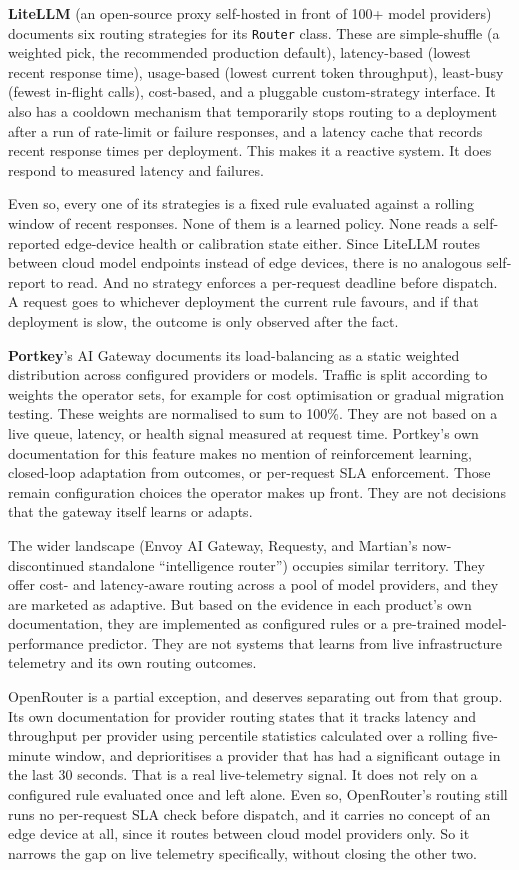 \textbf{LiteLLM} (an open-source proxy self-hosted in front of 100+
model providers) documents six routing strategies for its
\texttt{Router} class. These are simple-shuffle (a weighted pick, the
recommended production default), latency-based (lowest recent response
time), usage-based (lowest current token throughput), least-busy
(fewest in-flight calls), cost-based, and a pluggable custom-strategy
interface. It also has a cooldown mechanism that temporarily stops
routing to a deployment after a run of rate-limit or failure responses,
and a latency cache that records recent response times per deployment.
This makes it a reactive system. It does respond to measured latency
and failures.

Even so, every one of its strategies is a fixed rule evaluated against
a rolling window of recent responses. None of them is a learned policy.
None reads a self-reported edge-device health or calibration state
either. Since LiteLLM routes between cloud model endpoints instead of
edge devices, there is no analogous self-report to read. And no
strategy enforces a per-request deadline before dispatch. A request
goes to whichever deployment the current rule favours, and if that
deployment is slow, the outcome is only observed after the fact.

\textbf{Portkey}'s AI Gateway documents its load-balancing as a static
weighted distribution across configured providers or models. Traffic is
split according to weights the operator sets, for example for cost
optimisation or gradual migration testing. These weights are normalised
to sum to 100\%. They are not based on a live queue, latency, or health
signal measured at request time. Portkey's own documentation for this
feature makes no mention of reinforcement learning, closed-loop
adaptation from outcomes, or per-request SLA enforcement. Those remain
configuration choices the operator makes up front. They are not
decisions that the gateway itself learns or adapts.

The wider landscape (Envoy AI Gateway, Requesty, and Martian's
now-discontinued standalone ``intelligence router'') occupies similar
territory. They offer cost- and latency-aware routing across a pool of
model providers, and they are marketed as adaptive. But based on the
evidence in each product's own documentation, they are implemented as
configured rules or a pre-trained model-performance predictor. They are not
systems that learns from live infrastructure telemetry and its own
routing outcomes.

OpenRouter is a partial exception, and deserves separating out from
that group. Its own documentation for provider routing states that it
tracks latency and throughput per provider using percentile statistics
calculated over a rolling five-minute window, and deprioritises a
provider that has had a significant outage in the last 30 seconds. That
is a real live-telemetry signal. It does not rely on a configured rule 
evaluated once and left alone. Even so, OpenRouter's routing still runs 
no per-request SLA check before dispatch, and it carries no concept 
of an edge device at all, since it routes between cloud model providers 
only. So it narrows the gap on live telemetry specifically, without 
closing the other two.


